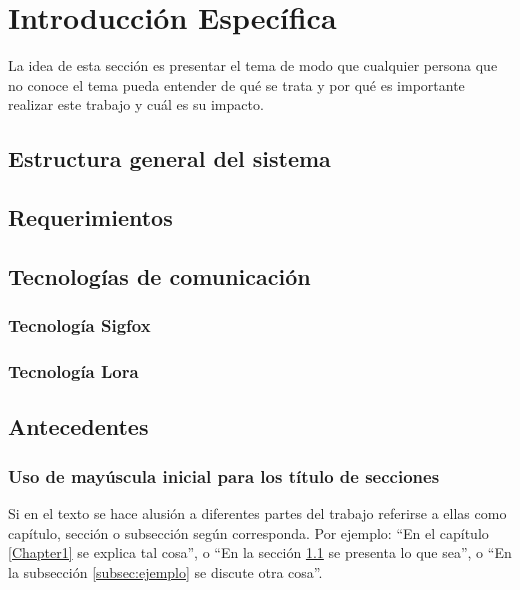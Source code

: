 \chapter{Introducción Específica} %

\label{Chapter2}

La idea de esta sección es presentar el tema de modo que cualquier persona que no conoce el tema pueda entender de qué se trata y por qué es importante realizar este trabajo y cuál es su impacto.
\section{Estructura general del sistema}
\label{sec:ejemplo}

\section{Requerimientos}


\section{Tecnologías de comunicación}

\subsection{Tecnología Sigfox}

\subsection{Tecnología Lora}

\section{Antecedentes}

\subsection{Uso de mayúscula inicial para los título de secciones}

Si en el texto se hace alusión a diferentes partes del trabajo referirse a ellas como capítulo, sección o subsección según corresponda. Por ejemplo: ``En el capítulo \ref{Chapter1} se explica tal cosa'', o ``En la sección \ref{sec:ejemplo} se presenta lo que sea'', o ``En la subsección \ref{subsec:ejemplo} se discute otra cosa''.

